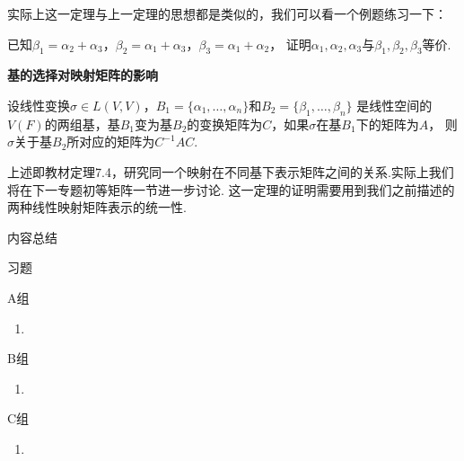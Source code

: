 实际上这一定理与上一定理的思想都是类似的，我们可以看一个例题练习一下：
\begin{example}
	已知$\beta_1=\alpha_2+\alpha_3$，$\beta_2=\alpha_1+\alpha_3$，$\beta_3=\alpha_1+\alpha_2$，
	证明$\alpha_1,\alpha_2,\alpha_3$与$\beta_1,\beta_2,\beta_3$等价.
\end{example}
\begin{theorem}
	\textbf{基的选择对映射矩阵的影响}
	
	设线性变换$\sigma \in L(V,V)$，$B_1=\{\alpha_1,\dots,\alpha_n\}$和$B_2=\{\beta_1,\dots,\beta_n\}$
	是线性空间的$V(F)$的两组基，基$B_1$变为基$B_2$的变换矩阵为$C$，如果$\sigma$在基$B_1$下的矩阵为$A$，
	则$\sigma$关于基$B_2$所对应的矩阵为$C^{-1}AC$.
\end{theorem}
上述即教材定理7.4，研究同一个映射在不同基下表示矩阵之间的关系.实际上我们将在下一专题初等矩阵一节进一步讨论.
这一定理的证明需要用到我们之前描述的两种线性映射矩阵表示的统一性.

\vspace{2ex} 
\centerline{\heiti \Large 内容总结}

\vspace{2ex} 

\centerline{\heiti \Large 习题}
\vspace{2ex} 
{\kaishu }
\begin{flushright}
    \kaishu

\end{flushright}
\centerline{\heiti A组}
\begin{enumerate}
	\item 
\end{enumerate}
\centerline{\heiti B组}
\begin{enumerate}
	\item 
\end{enumerate}
\centerline{\heiti C组}
\begin{enumerate}
	\item 
\end{enumerate}